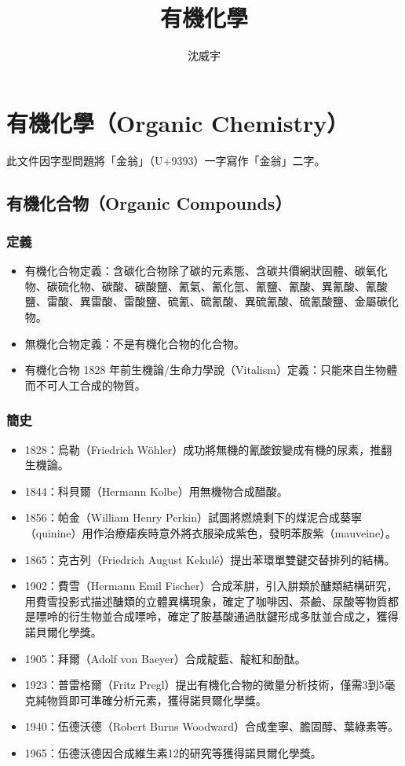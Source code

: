 \documentclass[a4paper,12pt]{report}
\begin{document}
\title{有機化學}
\author{沈威宇}
\date{\temtoday}
\titletocdoc
\chapter{有機化學（Organic Chemistry）}
此文件因字型問題將「金翁」（U+9393）一字寫作「金翁」二字。
\section{有機化合物（Organic Compounds）}
\subsection{定義}
\begin{itemize}
\item 有機化合物定義：含碳化合物除了碳的元素態、含碳共價網狀固體、碳氧化物、碳硫化物、碳酸、碳酸鹽、氰氣、氰化氫、氰鹽、氰酸、異氰酸、氰酸鹽、雷酸、異雷酸、雷酸鹽、硫氰、硫氰酸、異硫氰酸、硫氰酸鹽、金屬碳化物。
\item 無機化合物定義：不是有機化合物的化合物。
\item 有機化合物 1828 年前生機論/生命力學說（Vitalism）定義：只能來自生物體而不可人工合成的物質。
\end{itemize}
\subsection{簡史}
\begin{itemize}
\item 1828：烏勒（Friedrich Wöhler）成功將無機的氰酸銨變成有機的尿素，推翻生機論。
\item 1844：科貝爾（Hermann Kolbe）用無機物合成醋酸。
\item 1856：帕金（William Henry Perkin）試圖將燃燒剩下的煤泥合成葵寧（quinine）用作治療瘧疾時意外將衣服染成紫色，發明苯胺紫（mauveine）。
\item 1865：克古列（Friedrich August Kekulé）提出苯環單雙鍵交替排列的結構。
\item 1902：費雪（Hermann Emil Fischer）合成苯肼，引入肼類於醣類結構研究，用費雪投影式描述醣類的立體異構現象，確定了咖啡因、茶鹼、尿酸等物質都是嘌呤的衍生物並合成嘌呤，確定了胺基酸通過肽鍵形成多肽並合成之，獲得諾貝爾化學獎。
\item 1905：拜爾（Adolf von Baeyer）合成靛藍、靛紅和酚酞。
\item 1923：普雷格爾（Fritz Pregl）提出有機化合物的微量分析技術，僅需3到5毫克純物質即可準確分析元素，獲得諾貝爾化學獎。
\item 1940：伍德沃德（Robert Burns Woodward）合成奎寧、膽固醇、葉綠素等。
\item 1965：伍德沃德因合成維生素12的研究等獲得諾貝爾化學獎。
\end{itemize}
\end{document}
